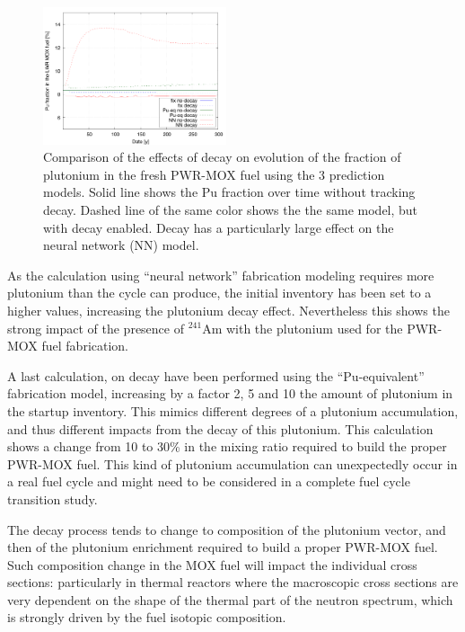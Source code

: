 \documentclass{anstrans}
\begin{document}
\begin{figure}[ht] %
  \centering
  \includegraphics[width=0.48\textwidth]{decay_pu_contribution.png}
  \caption{Comparison of the effects of decay on
    evolution of the fraction of plutonium in the fresh PWR-MOX fuel
    using the 3 prediction models.  Solid line shows the Pu fraction over time
    without tracking decay. Dashed line of the same color shows the the
    same model, but with decay enabled. Decay has a particularly large effect
  on the neural network (NN) model.}
  \label{fig:d}
\end{figure}


As the calculation using ``neural network'' fabrication modeling requires more
plutonium than the cycle can produce, the initial inventory has been set to a
higher values, increasing the plutonium decay effect. Nevertheless this shows
the strong impact of the presence of $^{241}$Am with the plutonium used for the
PWR-MOX fuel fabrication.


A last calculation, on decay have been performed using the ``Pu-equivalent''
fabrication model, increasing by a factor 2, 5 and 10 the amount of plutonium in
the startup inventory.  This mimics different degrees of a plutonium accumulation,
and thus different impacts from the decay of this plutonium.
This calculation shows a change from 10 to 30\% in the mixing ratio required to
build the proper PWR-MOX fuel. This kind of plutonium accumulation can
unexpectedly occur in a real fuel cycle and might need to be considered in a
complete fuel cycle transition study.


The decay process tends to change to composition of the plutonium vector, and
then of the plutonium enrichment required to build a proper PWR-MOX fuel.  Such
composition change in the MOX fuel will impact the individual cross sections:
particularly in thermal reactors where the macroscopic cross sections are very
dependent on the shape of the thermal part of the neutron spectrum, which is
strongly driven by the fuel isotopic composition.
\end{document}
